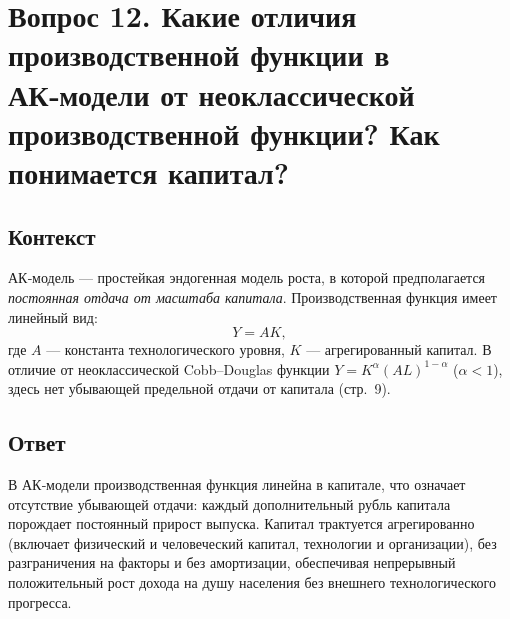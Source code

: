 \section*{Вопрос 12. Какие отличия производственной функции в АК‑модели от неоклассической производственной функции? Как понимается капитал?}

\subsection*{Контекст}
АК‑модель — простейкая эндогенная модель роста, в которой предполагается \emph{постоянная отдача от масштаба капитала}. 
Производственная функция имеет линейный вид:
\[
Y = A K,
\]
где \(A\) — константа технологического уровня, \(K\) — агрегированный капитал. В отличие от неоклассической Cobb–Douglas 
функции \(Y=K^\alpha (AL)^{1-\alpha}\) (\(\alpha<1\)), здесь нет убывающей предельной отдачи от капитала (стр.~9).

\subsection*{Ответ}
В АК‑модели производственная функция линейна в капитале, что означает отсутствие убывающей отдачи: каждый дополнительный рубль 
капитала порождает постоянный прирост выпуска. Капитал трактуется агрегированно (включает физический и человеческий капитал, 
технологии и организации), без разграничения на факторы и без амортизации, обеспечивая непрерывный положительный рост дохода 
на душу населения без внешнего технологического прогресса.
